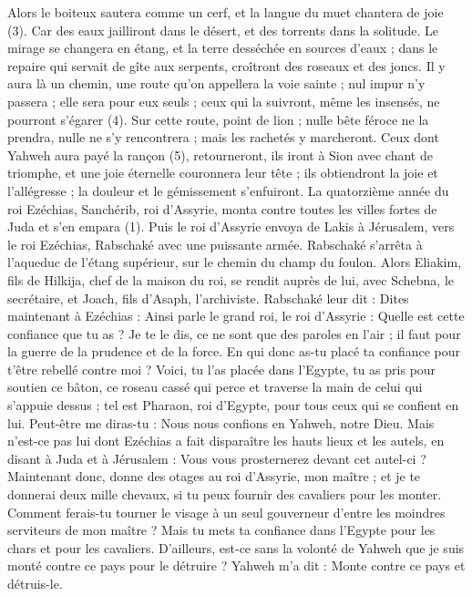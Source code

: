 \begin{multicols}{2}
{Alors le boiteux sautera comme un cerf, et la langue du muet chantera de joie (3). Car des eaux jailliront dans le désert, et des torrents dans la solitude.
Le mirage se changera en étang, et la terre desséchée en sources d’eaux ; dans le repaire qui servait de gîte aux serpents, croîtront des roseaux et des joncs.
Il y aura là un chemin, une route qu’on appellera la voie sainte ; nul impur n’y passera ; elle sera pour eux seuls ; ceux qui la suivront, même les insensés, ne pourront s’égarer (4).
Sur cette route, point de lion ; nulle bête féroce ne la prendra, nulle ne s’y rencontrera ; mais les rachetés y marcheront.
Ceux dont Yahweh aura payé la rançon (5), retourneront, ils iront à Sion avec chant de triomphe, et une joie éternelle couronnera leur tête ; ils obtiendront la joie et l'allégresse ; la douleur et le gémissement s'enfuiront.
\VerseOne{}La quatorzième année du roi Ezéchias, Sanchérib, roi d’Assyrie, monta contre toutes les villes fortes de Juda et s’en empara (1).
Puis le roi d’Assyrie envoya de Lakis à Jérusalem, vers le roi Ezéchias, Rabschaké avec une puissante armée. Rabschaké s’arrêta à l’aqueduc de l’étang supérieur, sur le chemin du champ du foulon.
Alors Eliakim, fils de Hilkija, chef de la maison du roi, se rendit auprès de lui, avec Schebna, le secrétaire, et Joach, fils d'Asaph, l’archiviste.
Rabschaké leur dit : Dites maintenant à Ezéchias : Ainsi parle le grand roi, le roi d’Assyrie : Quelle est cette confiance que tu as ?
Je te le dis, ce ne sont que des paroles en l’air ; il faut pour la guerre de la prudence et de la force. En qui donc as-tu placé ta confiance pour t’être rebellé contre moi ?
Voici, tu l’as placée dans l’Egypte, tu as pris pour soutien ce bâton, ce roseau cassé qui perce et traverse la main de celui qui s’appuie dessus ; tel est Pharaon, roi d’Egypte, pour tous ceux qui se confient en lui.
Peut-être me diras-tu : Nous nous confions en Yahweh, notre Dieu. Mais n'est-ce pas lui dont Ezéchias a fait disparaître les hauts lieux et les autels, en disant à Juda et à Jérusalem : Vous vous prosternerez devant cet autel-ci ?
Maintenant donc, donne des otages au roi d’Assyrie, mon maître ; et je te donnerai deux mille chevaux, si tu peux fournir des cavaliers pour les monter.
Comment ferais-tu tourner le visage à un seul gouverneur d’entre les moindres serviteurs de mon maître ? Mais tu mets ta confiance dans l'Egypte pour les chars et pour les cavaliers.
D’ailleurs, est-ce sans la volonté de Yahweh que je suis monté contre ce pays pour le détruire ? Yahweh m'a dit : Monte contre ce pays et détruis-le.
}
\end{multicols}
